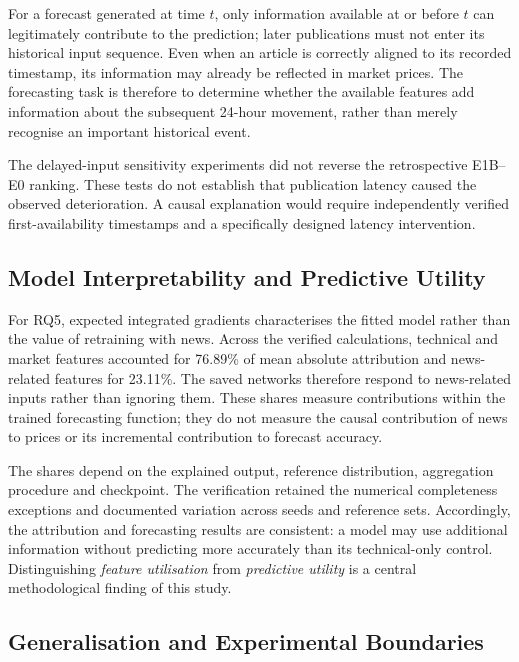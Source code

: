 For a forecast generated at time $t$, only information available at or before $t$ can legitimately contribute to the prediction; later publications must not enter its historical input sequence. Even when an article is correctly aligned to its recorded timestamp, its information may already be reflected in market prices. The forecasting task is therefore to determine whether the available features add information about the subsequent 24-hour movement, rather than merely recognise an important historical event.

The delayed-input sensitivity experiments did not reverse the retrospective E1B--E0 ranking. These tests do not establish that publication latency caused the observed deterioration. A causal explanation would require independently verified first-availability timestamps and a specifically designed latency intervention.

\subsection{Model Interpretability and Predictive Utility}
\label{subsec:discussion-interpretability}

For RQ5, expected integrated gradients characterises the fitted model rather than the value of retraining with news. Across the verified calculations, technical and market features accounted for 76.89\% of mean absolute attribution and news-related features for 23.11\%. The saved networks therefore respond to news-related inputs rather than ignoring them. These shares measure contributions within the trained forecasting function; they do not measure the causal contribution of news to prices or its incremental contribution to forecast accuracy.

The shares depend on the explained output, reference distribution, aggregation procedure and checkpoint. The verification retained the numerical completeness exceptions and documented variation across seeds and reference sets. Accordingly, the attribution and forecasting results are consistent: a model may use additional information without predicting more accurately than its technical-only control. Distinguishing \emph{feature utilisation} from \emph{predictive utility} is a central methodological finding of this study.

\subsection{Generalisation and Experimental Boundaries}
\label{subsec:discussion-generalisation}

